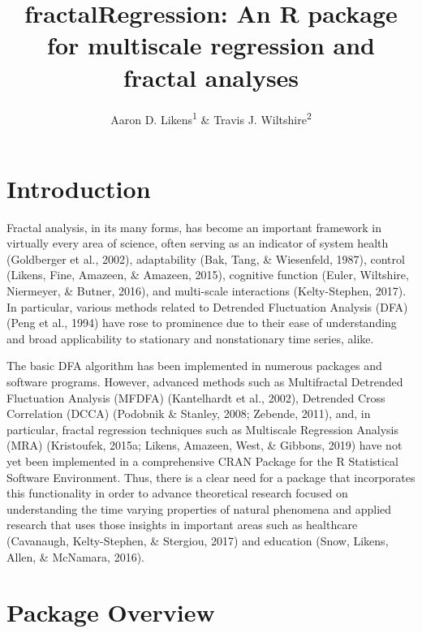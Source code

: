 \documentclass[
  english,
  man]{apa6}
\title{fractalRegression: An R package for multiscale regression and fractal analyses}
\author{Aaron D. Likens\textsuperscript{1} \& Travis J. Wiltshire\textsuperscript{2}}
\date{}
\affiliation{\vspace{0.5cm}\textsuperscript{1} Department of Biomechanics, University of Nebraska at Omaha\\\textsuperscript{2} Department of Cognitive Science \& Artificial Intelligence, Tilburg University}
\begin{document}
\maketitle

\hypertarget{introduction}{%
\section{Introduction}\label{introduction}}

Fractal analysis, in its many forms, has become an important framework
in virtually every area of science, often serving as an indicator of
system health (Goldberger et al., 2002), adaptability
(Bak, Tang, \& Wiesenfeld, 1987), control
(Likens, Fine, Amazeen, \& Amazeen, 2015), cognitive function
(Euler, Wiltshire, Niermeyer, \& Butner, 2016), and multi-scale interactions
(Kelty-Stephen, 2017). In particular, various
methods related to Detrended Fluctuation Analysis (DFA)
(Peng et al., 1994) have rose to prominence due to their
ease of understanding and broad applicability to stationary and
nonstationary time series, alike.

The basic DFA algorithm has been implemented in numerous packages and
software programs. However, advanced methods such as Multifractal
Detrended Fluctuation Analysis (MFDFA)
(Kantelhardt et al., 2002), Detrended Cross
Correlation (DCCA) (Podobnik \& Stanley, 2008; Zebende, 2011), and, in particular,
fractal regression techniques such as Multiscale Regression Analysis
(MRA) (Kristoufek, 2015a; Likens, Amazeen, West, \& Gibbons, 2019) have not yet been
implemented in a comprehensive CRAN Package for the R Statistical
Software Environment. Thus, there is a clear need for a package that
incorporates this functionality in order to advance theoretical research
focused on understanding the time varying properties of natural
phenomena and applied research that uses those insights in important
areas such as healthcare (Cavanaugh, Kelty-Stephen, \& Stergiou, 2017) and education (Snow, Likens, Allen, \& McNamara, 2016).

\hypertarget{package-overview}{%
\section{Package Overview}\label{package-overview}}
\end{document}

